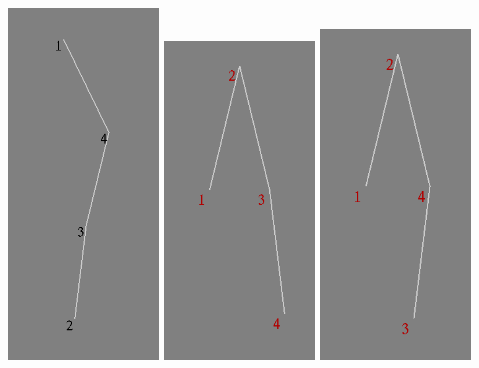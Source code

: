 \documentclass{ltjsarticle}
\begin{document}
\includegraphics[width=4cm]{6.png}
\includegraphics[width=4cm]{7.png}
\includegraphics[width=4cm]{8.png}
\end{document}
